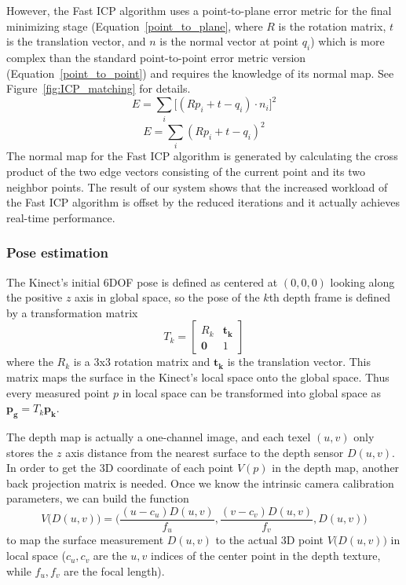 \documentclass[12pt]{article}
\begin{document}
However, the Fast ICP algorithm uses a point-to-plane error metric for the final minimizing stage (Equation~\ref{point_to_plane}, where $R$ is the rotation matrix, $t$ is the translation vector, and $n$ is the normal vector at point $q_i$) which is more complex than the standard point-to-point error metric version (Equation~\ref{point_to_point}) and requires the knowledge of its normal map. See Figure~\ref{fig:ICP_matching} for details.
\begin{equation}\label{point_to_plane}
E=\sum_{i}{}\big[(Rp_i+t-q_i)\cdot n_i\big]^2
\end{equation}
\begin{equation}\label{point_to_point}
E=\sum_{i}{}(Rp_i+t-q_i)^2
\end{equation}
The normal map for the Fast ICP algorithm is generated by calculating the cross product of the two edge vectors consisting of the current point and its two neighbor points. The result of our system shows that the increased workload of the Fast ICP algorithm is offset by the reduced iterations and it actually achieves real-time performance.

\subsubsection{Pose estimation}
The Kinect's initial 6DOF pose is defined as centered at $( 0, 0, 0 )$ looking along the positive $z$ axis in global space, so the pose of the $k$th depth frame is defined by a transformation matrix
$$T_k = \begin{bmatrix}
            R_k         &   \mathbf{t_k} \\
            \mathbf{0}   &   1           
        \end{bmatrix}$$
where the $R_k$ is a 3x3 rotation matrix and $\mathbf{t_k}$ is the translation vector. This matrix maps the surface in the Kinect's local space onto the global space. Thus every measured point $p$ in local space can be transformed into global space as $\mathbf{p_g} = T_k\mathbf{p_k}$.

The depth map is actually a one-channel image, and each texel $(u,v)$ only stores the $z$ axis distance from the nearest surface to the depth sensor $D(u,v)$. In order to get the 3D coordinate of each point $V(p)$ in the depth map, another back projection matrix is needed. Once we know the intrinsic camera calibration parameters, we can build the function
$$V\big(D(u,v)\big)=\Big(\frac{(u-c_u)D(u,v)}{f_u},\frac{(v-c_v)D(u,v)}{f_v},D(u,v)\Big)$$
to map the surface measurement $D(u,v)$ to the actual 3D point $V\big(D(u,v)\big)$ in local space ($c_u,c_v$ are the $u,v$ indices of the center point in the depth texture, while $f_u,f_v$ are the focal length).
\end{document}
